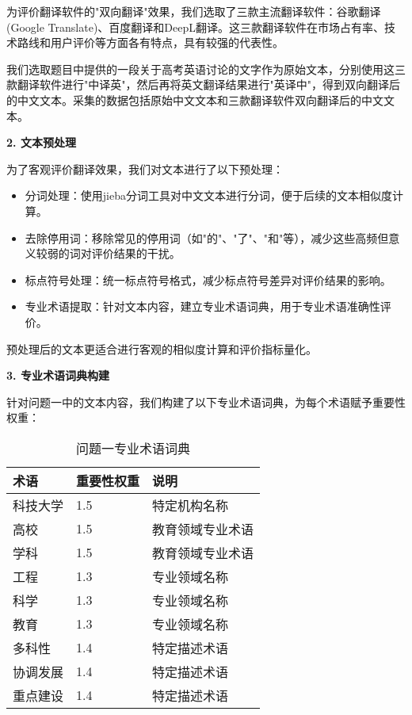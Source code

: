 \documentclass[bwprint]{cumcmthesis}
\begin{document}
为评价翻译软件的"双向翻译"效果，我们选取了三款主流翻译软件：谷歌翻译(Google Translate)、百度翻译和DeepL翻译。这三款翻译软件在市场占有率、技术路线和用户评价等方面各有特点，具有较强的代表性。

我们选取题目中提供的一段关于高考英语讨论的文字作为原始文本，分别使用这三款翻译软件进行"中译英"，然后再将英文翻译结果进行"英译中"，得到双向翻译后的中文文本。采集的数据包括原始中文文本和三款翻译软件双向翻译后的中文文本。
    
\textbf{2. 文本预处理}
    
为了客观评价翻译效果，我们对文本进行了以下预处理：
\begin{itemize}
    \item 分词处理：使用jieba分词工具对中文文本进行分词，便于后续的文本相似度计算。
    \item 去除停用词：移除常见的停用词（如"的"、"了"、"和"等），减少这些高频但意义较弱的词对评价结果的干扰。
    \item 标点符号处理：统一标点符号格式，减少标点符号差异对评价结果的影响。
    \item 专业术语提取：针对文本内容，建立专业术语词典，用于专业术语准确性评价。
\end{itemize}

预处理后的文本更适合进行客观的相似度计算和评价指标量化。
    
\textbf{3. 专业术语词典构建}
    
针对问题一中的文本内容，我们构建了以下专业术语词典，为每个术语赋予重要性权重：
\begin{table}[H]
\centering
\caption{问题一专业术语词典}
\begin{tabularx}{0.8\textwidth}{XXX}
\toprule
术语 & 重要性权重 & 说明 \\
\midrule
科技大学 & 1.5 & 特定机构名称 \\
高校 & 1.5 & 教育领域专业术语 \\
学科 & 1.5 & 教育领域专业术语 \\
工程 & 1.3 & 专业领域名称 \\
科学 & 1.3 & 专业领域名称 \\
教育 & 1.3 & 专业领域名称 \\
多科性 & 1.4 & 特定描述术语 \\
协调发展 & 1.4 & 特定描述术语 \\
重点建设 & 1.4 & 特定描述术语 \\
\bottomrule
\end{tabularx}
\label{tab:术语词典1}
\end{table}
\end{document}
